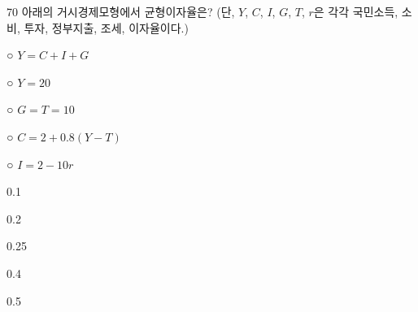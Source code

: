 \begin{question}{70}
아래의 거시경제모형에서 균형이자율은? (단, $Y$, $C$, $I$, $G$, $T$, $r$은 각각 국민소득, 소비, 투자, 정부지출, 조세, 이자율이다.)
\begin{framedtext}
○ $Y=C+I+G$ \par
○ $Y=20$ \par
○ $G=T=10$ \par
○ $C=2+0.8(Y-T)$ \par
○ $I=2-10r$ \par
\end{framedtext}
\begin{choices}
  \item 0.1
  \item 0.2
  \item 0.25
  \item 0.4
  \item 0.5
\end{choices}
\end{question}
